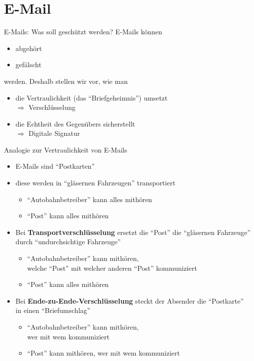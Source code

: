 \section{E-Mail}
  \begin{frame}{E-Mails: Was soll geschützt werden?}
    E-Mails können
    \begin{itemize}
      \item abgehört
      \item gefälscht
    \end{itemize}
    werden. Deshalb stellen wir vor, wie man
    \begin{itemize}
      \item die Vertraulichkeit (das ``Briefgeheimnis'') umsetzt
      \\ $\Rightarrow$ Verschlüsselung
      \item die Echtheit des Gegenübers sicherstellt
      \\ $\Rightarrow$ Digitale Signatur
    \end{itemize}
  \end{frame}

  \begin{frame}{Analogie zur Vertraulichkeit von E-Mails}
    \begin{itemize}
      \item E-Mails sind ``Postkarten''
      \item diese werden in ``gläsernen Fahrzeugen'' transportiert
      \begin{itemize}
        \item ``Autobahnbetreiber'' kann alles mithören
        \item ``Post'' kann alles mithören
      \end{itemize}
      \item Bei \textbf{Transportverschlüsselung} ersetzt die ``Post'' die ``gläsernen Fahrzeuge'' durch ``undurchsichtige Fahrzeuge''
      \begin{itemize}
        \item ``Autobahnbetreiber'' kann mithören,\\welche ``Post'' mit welcher anderen ``Post'' kommuniziert
        \item ``Post'' kann alles mithören
      \end{itemize}
      \item Bei \textbf{Ende-zu-Ende-Verschlüsselung} steckt der Absender die ``Postkarte'' in einen ``Briefumschlag''
      \begin{itemize}
        \item ``Autobahnbetreiber'' kann mithören,\\wer mit wem kommuniziert
        \item ``Post'' kann mithören, wer mit wem kommuniziert
      \end{itemize}
    \end{itemize}
  \end{frame}

